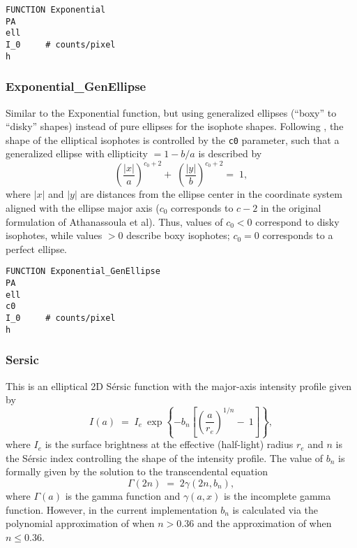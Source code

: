 \documentclass[10pt,a4paper,article]{memoir}
\begin{document}
\begin{verbatim}
FUNCTION Exponential
PA
ell
I_0     # counts/pixel
h
\end{verbatim}


\subsubsection{Exponential\_GenEllipse}

Similar to the Exponential function, but using generalized ellipses (``boxy'' to
``disky'' shapes) instead of pure ellipses for the isophote shapes.  Following
\citet{athanassoula90}, the shape of the elliptical isophotes is controlled by
the \texttt{c0} parameter, such that a generalized ellipse with ellipticity $= 1
- b/a$ is described by
\begin{equation}
\left( \frac{|x|}{a} \right)^{c_{0} + 2} \! \! + \; \left( \frac{|y|}{b} \right)^{c_{0} + 2}  = \; 1,
\end{equation}
where $|x|$ and $|y|$ are distances from the ellipse center in the coordinate system
aligned with the ellipse major axis ($c_{0}$ corresponds to $c - 2$ in the original
formulation of Athanassoula et al).
Thus, values of $c_{0} < 0$ correspond to disky isophotes, while values $> 0$ describe boxy
isophotes; $c_{0} = 0$ corresponds to a perfect ellipse.

\begin{verbatim}
FUNCTION Exponential_GenEllipse
PA
ell
c0
I_0     # counts/pixel
h
\end{verbatim}


\subsubsection{Sersic}

This is an elliptical 2D S\'ersic function with the major-axis intensity
profile given by
\begin{equation}
I(a) \; = \; I_{e} \: \exp \left\{ -b_{n} \left[ \left( \frac{a}{r_{e}} \right)^{1/n} \! - \: 1 \right] \right\},
\end{equation}
where $I_{e}$ is the surface brightness at the effective (half-light) radius $r_{e}$
and $n$ is the S\'ersic index controlling the shape of the intensity profile. The
value of $b_{n}$ is formally given by the solution to the transcendental equation
\begin{equation}
\Gamma(2 n) \; = \; 2 \gamma(2n, b_{n}),
\end{equation}
where $\Gamma(a)$ is the gamma function and $\gamma(a, x)$ is the incomplete gamma function.
However, in the current implementation $b_{n}$ is calculated via the polynomial approximation
of \citet{ciotti99} when $n > 0.36$ and the approximation of \citet{macarthur03} when
$n \leq 0.36$.
\end{document}
